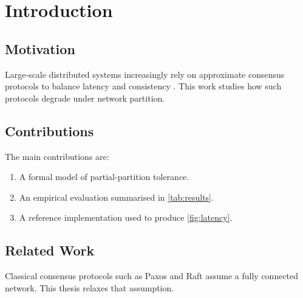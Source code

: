 \chapter{Introduction}
\label{ch:introduction}

\section{Motivation}

Large-scale distributed systems increasingly rely on approximate
consensus protocols to balance latency and consistency
\citep{lamport1998part}. This work studies how such protocols degrade
under network partition.

\section{Contributions}

The main contributions are:

\begin{enumerate}
  \item A formal model of partial-partition tolerance.
  \item An empirical evaluation summarised in \autoref{tab:results}.
  \item A reference implementation used to produce
    \autoref{fig:latency}.
\end{enumerate}

\section{Related Work}

Classical consensus protocols such as Paxos \citep{lamport1998part} and
Raft \citep{ongaro2014search} assume a fully connected network. This
thesis relaxes that assumption.
